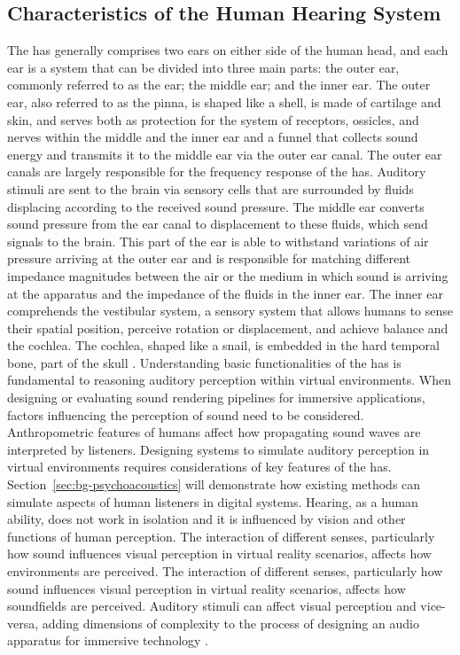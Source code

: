 \subsection{Characteristics of the Human Hearing System}
The \acrfull{has} generally comprises two ears on either side of the human head, and each ear is a system that can be divided into three main parts: the outer ear, commonly referred to as the ear; the middle ear; and the inner ear. The outer ear, also referred to as the pinna, is shaped like a shell, is made of cartilage and skin, and serves both as protection for the system of receptors, ossicles, and nerves within the middle and the inner ear and a funnel that collects sound energy and transmits it to the middle ear via the outer ear canal. The outer ear canals are largely responsible for the frequency response of the \acrshort{has}. 
Auditory stimuli are sent to the brain via sensory cells that are surrounded by fluids displacing according to the received sound pressure. The middle ear converts sound pressure from the ear canal to displacement to these fluids, which send signals to the brain. This part of the ear is able to withstand variations of air pressure arriving at the outer ear and is responsible for matching different impedance magnitudes between the air or the medium in which sound is arriving at the apparatus and the impedance of the fluids in the inner ear.
The inner ear comprehends the vestibular system, a sensory system that allows humans to sense their spatial position, perceive rotation or displacement, and achieve balance and the cochlea. The cochlea, shaped like a snail, is embedded in the hard temporal bone, part of the skull \citep{zwicker2013psychoacoustics}.
Understanding basic functionalities of the \acrshort{has} is fundamental to reasoning auditory perception within virtual environments. When designing or evaluating sound rendering pipelines for immersive applications, factors influencing the perception of sound need to be considered.
Anthropometric features of humans affect how propagating sound waves are interpreted by listeners. Designing systems to simulate auditory perception in virtual environments requires considerations of key features of the \acrshort{has}. Section~\ref{sec:bg-psychoacoustics} will demonstrate how existing methods can simulate aspects of human listeners in digital systems.
Hearing, as a human ability, does not work in isolation and it is influenced by vision and other functions of human perception. The interaction of different senses, particularly how sound influences visual perception in virtual reality scenarios, affects how environments are perceived. The interaction of different senses, particularly how sound influences visual perception in virtual reality scenarios, affects how soundfields are perceived. Auditory stimuli can affect visual perception and vice-versa, adding dimensions of complexity to the process of designing an audio apparatus for immersive technology \citep{malpica2020crossmodal}.
